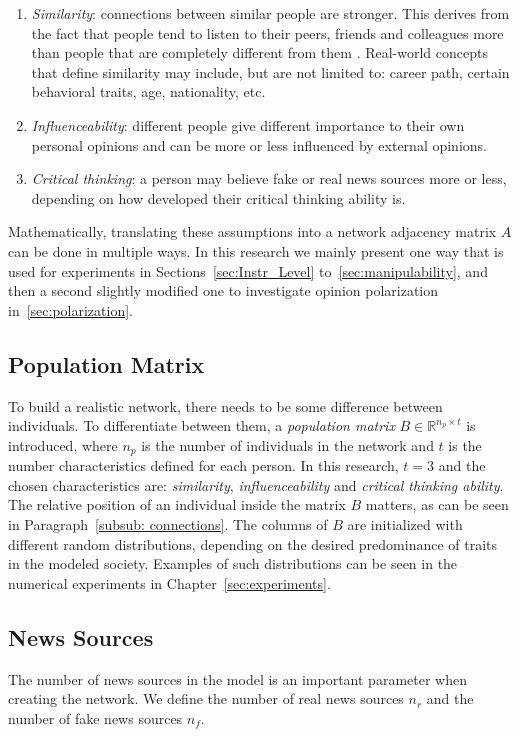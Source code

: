\renewcommand{\theenumi}{\roman{enumi}}
\begin{enumerate}
\item \textit{Similarity}: connections between similar people are stronger. This derives from the fact that people tend to listen to their peers, friends and colleagues more than people that are completely different from them \cite{Youyou2017}\cite{Afifi2013}. Real-world concepts that define similarity may include, but are not limited to: career path, certain behavioral traits, age, nationality, etc.

\item \textit{Influenceability}: different people give different importance to their own personal opinions and can be more or less influenced by external opinions.
\item \textit{Critical thinking}: a person may believe fake or real news sources more or less, depending on how developed their critical thinking ability is.
\end{enumerate}
Mathematically, 
translating these assumptions into a network adjacency matrix $A$ can be done in multiple ways. In this research we mainly present one way that is used for experiments in Sections~\ref{sec:Instr_Level} to~\ref{sec:manipulability}, and then a second slightly modified one to investigate opinion polarization in~\ref{sec:polarization}. 

\subsection{Population Matrix}
To build a realistic network, there needs to be some difference between individuals. To differentiate between them, a \textit{population matrix} $B \in \mathbb{R}^{n_p \times t}$ is introduced, where $n_p$ is the number of individuals in the network and $t$ is the number characteristics defined for each person. In this research, $t=3$ and the chosen characteristics are: \textit{similarity}, \textit{influenceability} and \textit{critical thinking ability}. The relative position of an individual inside the matrix $B$ matters, as can be seen in Paragraph~\ref{subsub: connections}. The columns of $B$ are initialized with different random distributions, depending on the desired predominance of traits in the modeled society. Examples of such distributions can be seen in the numerical experiments in Chapter~\ref{sec:experiments}.
\subsection{News Sources}
The number of news sources in the model is an important parameter when creating the network. We define the number of real news sources $n_{r}$ and the number of fake news sources $n_{f}$.
